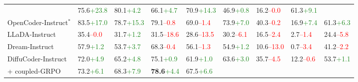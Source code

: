 \begin{table}[t]
\begin{tabular}{@{} l ll ll l ll l @{}}
        & 75.6{\tiny\textcolor{ForestGreen}{+23.8}}  
        & 80.1{\tiny\textcolor{ForestGreen}{+4.2}}  
        & 66.1{\tiny\textcolor{ForestGreen}{+4.7}}  
        & 70.9{\tiny\textcolor{ForestGreen}{+14.3}}  
        & 46.9{\tiny\textcolor{ForestGreen}{+0.8}}  
        & 16.2{\tiny\textcolor{red}{–0.0}}  
        & 61.3{\tiny\textcolor{ForestGreen}{+9.1}} \\
        \cellcolor{lightRed!12}OpenCoder-Instruct$^*$      
        & 83.5{\tiny\textcolor{ForestGreen}{+17.0}}  
        & 78.7{\tiny\textcolor{ForestGreen}{+15.3}}  
        & 79.1{\tiny\textcolor{red}{–0.8}}  
        & 69.0{\tiny\textcolor{red}{–1.4}}  
        & 73.9{\tiny\textcolor{ForestGreen}{+7.0}}  
        & 40.3{\tiny\textcolor{red}{–0.2}}  
        & 16.9{\tiny\textcolor{ForestGreen}{+7.4}}  
        & 61.3{\tiny\textcolor{ForestGreen}{+6.3}} \\
        \cellcolor{lightYellow!12}LLaDA-Instruct        
        & 35.4{\tiny\textcolor{red}{–0.0}}  
        & 31.7{\tiny\textcolor{ForestGreen}{+1.2}}  
        & 31.5{\tiny\textcolor{red}{–18.6}}  
        & 28.6{\tiny\textcolor{red}{–13.5}}  
        & 30.2{\tiny\textcolor{red}{–6.1}}  
        & 16.5{\tiny\textcolor{red}{–2.4}}  
        & 2.7{\tiny\textcolor{red}{–1.4}}  
        & 24.4{\tiny\textcolor{red}{–5.8}} \\
    \cellcolor{lightYellow!12}Dream-Instruct        
        & 57.9{\tiny\textcolor{ForestGreen}{+1.2}}  
        & 53.7{\tiny\textcolor{ForestGreen}{+3.7}}  
        & 68.3{\tiny\textcolor{red}{–0.4}}  
        & 56.1{\tiny\textcolor{red}{–1.3}}  
        & 54.9{\tiny\textcolor{ForestGreen}{+1.2}}  
        & 10.6{\tiny\textcolor{red}{–13.0}}  
        & 0.7{\tiny\textcolor{red}{–3.4}}  
        & 41.2{\tiny\textcolor{red}{–2.2}} \\
    \cellcolor{lightYellow!12}DiffuCoder-Instruct   
        & 72.0{\tiny\textcolor{ForestGreen}{+4.9}}  
        & 65.2{\tiny\textcolor{ForestGreen}{+4.8}}  
        & 75.1{\tiny\textcolor{ForestGreen}{+0.9}}  
        & 61.9{\tiny\textcolor{ForestGreen}{+1.0}}  
        & 63.6{\tiny\textcolor{ForestGreen}{+3.0}}  
        & 35.7{\tiny\textcolor{red}{–4.5}}  
        & 12.2{\tiny\textcolor{red}{–0.6}}  
        & 53.7{\tiny\textcolor{ForestGreen}{+1.1}} \\
    \cellcolor{lightYellow!12}\quad + coupled-GRPO   
        & 73.2{\tiny\textcolor{ForestGreen}{+6.1}}  
        & 68.3{\tiny\textcolor{ForestGreen}{+7.9}}  
        & \textbf{78.6}{\tiny\textcolor{ForestGreen}{+4.4}}  
        & 67.5{\tiny\textcolor{ForestGreen}{+6.6}}  

\end{tabular}
\end{table}
